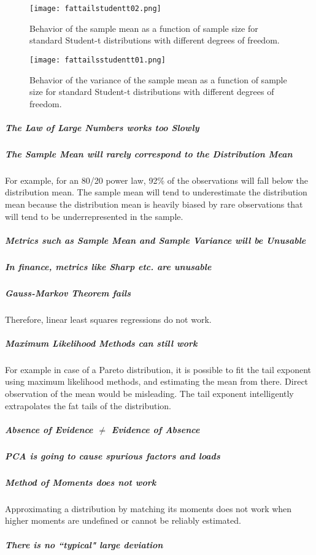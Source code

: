 \begin{figure}
\centering
    \texttt{[image: fattailstudentt02.png]}
    \caption{Behavior of the sample mean as a function of sample size for standard Student-t distributions with different degrees of freedom.}
    \label{fig:fattails02}
\end{figure}

\begin{figure}
\centering
    \texttt{[image: fattailsstudentt01.png]}
    \caption{Behavior of the variance of the sample mean as a function of sample size for standard Student-t distributions with different degrees of freedom.}
    \label{fig:fattails03}
\end{figure}



\subparagraph{The Law of Large Numbers works too Slowly}

\subparagraph{The Sample Mean will rarely correspond to the Distribution Mean}
For example, for an 80/20 power law, 92\% of the observations will fall below the distribution mean. The sample mean will tend to underestimate the distribution mean because the distribution mean is heavily biased by rare observations that will tend to be underrepresented in the sample.

\subparagraph{Metrics such as Sample Mean and Sample Variance will be Unusable}

\subparagraph{In finance, metrics like Sharp etc. are unusable}

\subparagraph{Gauss-Markov Theorem fails}
Therefore, linear least squares regressions do not work. 

\subparagraph{Maximum Likelihood Methods can still work}
For example in case of a Pareto distribution, it is possible to fit the tail exponent using maximum likelihood methods, and estimating the mean from there. Direct observation of the mean would be misleading. The tail exponent intelligently extrapolates the fat tails of the distribution.

\subparagraph{Absence of Evidence $\neq$ Evidence of Absence}

\subparagraph{PCA is going to cause spurious factors and loads}

\subparagraph{Method of Moments does not work}
Approximating a distribution by matching its moments does not work when higher moments are undefined or cannot be reliably estimated.

\subparagraph{There is no ``typical" large deviation}


